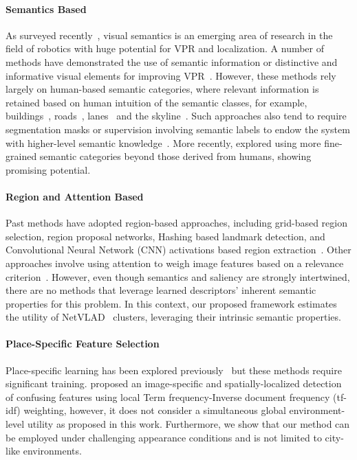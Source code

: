 \documentclass[letterpaper, 10 pt, conference]{ieeeconf}  \fi
\begin{document}
\paragraph{Semantics Based} As surveyed recently~\cite{garg2020semantics}, visual semantics is an emerging area of research in the field of robotics with huge potential for VPR and localization. A number of methods have demonstrated the use of semantic information or distinctive and informative visual elements for improving VPR~\cite{schreiber2013laneloc, atanasov2016localization, stone2016skyline, weng2018semantic, naseer2017semantics,garg2018lost,gawel2018x}. However, these methods rely largely on human-based semantic categories, where relevant information is retained based on human intuition of the semantic classes, for example, buildings~\cite{naseer2017semantics}, roads~\cite{garg2018lost,gawel2018x}, lanes~\cite{schreiber2013laneloc} and the skyline~\cite{stone2016skyline}. Such approaches also tend to require segmentation masks or supervision involving semantic labels to endow the system with higher-level semantic knowledge~\cite{naseer2017semantics, gawel2018x, garg2018lost}. More recently, \cite{larsson2019fine} explored using more fine-grained semantic categories beyond those derived from humans, showing promising potential.

\paragraph{Region and Attention Based}
Past methods have adopted region-based approaches, including grid-based region selection, region proposal networks, Hashing based landmark detection, and Convolutional Neural Network (CNN) activations based region extraction~\cite{8202131,khaliq2019holistic,8421024,sunderhauf2015place}. Other approaches involve using attention to weigh image features based on a relevance criterion~\cite{gordo2016deep}.  However, even though semantics and saliency are strongly intertwined, there are no methods that leverage learned descriptors' inherent semantic properties for this problem. In this context, our proposed framework estimates the utility of NetVLAD~\cite{arandjelovic2016netvlad} clusters, leveraging their intrinsic semantic properties.

\paragraph{Place-Specific Feature Selection}
\label{sec:LitDiscriminative} 
Place-specific learning has been explored previously~\cite{carl2012makes, gronat2013learning, mcmanus2014scene} but these methods require significant training. \cite{knopp2010avoiding} proposed an image-specific and spatially-localized detection of confusing features using local Term frequency-Inverse document frequency (tf-idf) weighting, however, it does not consider a simultaneous global environment-level utility as proposed in this work. Furthermore, we show that our method can be employed under challenging appearance conditions and is not limited to city-like environments.
\end{document}
